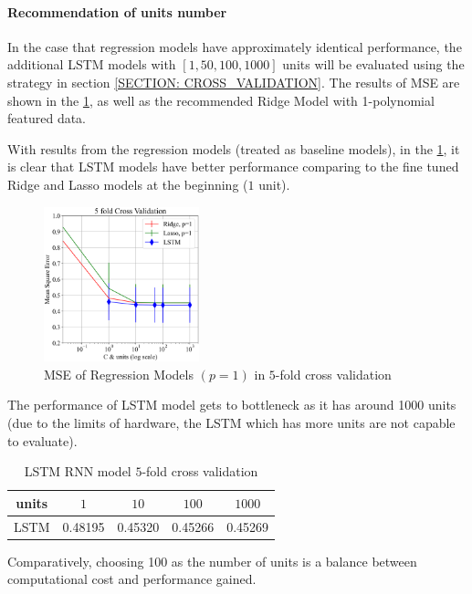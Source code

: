 \paragraph{Recommendation of units number}
In the case that regression models have approximately identical performance,
the additional LSTM models with $[1, 50, 100, 1000]$ units will be evaluated 
using the strategy in section \ref{SECTION: CROSS_VALIDATION}.
The results of MSE are shown in the \ref{FIGURES: LSTM, Ridge, Cross Validation},
as well as the recommended Ridge Model with 1-polynomial featured data.

With results from the regression models (treated as baseline models),
in the \ref{FIGURES: LSTM, Ridge, Cross Validation}, 
it is clear that LSTM models have better performance comparing 
to the fine tuned Ridge and Lasso models at the beginning ($1$ unit).
\begin{figure}[H]
    \centering
    \includegraphics[width=0.4\textwidth]{chap/fig2.png}
    \caption{
        \footnotesize 
        MSE of Regression Models $(p=1)$ in
        $5$-fold cross validation
        } %
    \label{FIGURES: LSTM, Ridge, Cross Validation}
\end{figure}
The performance of LSTM model gets to bottleneck as it has around 1000 units 
(due to the limits of hardware, the LSTM which has more units are not capable 
to evaluate). 
\begin{table}[H]
    \footnotesize
    \centering
        \caption{
            \footnotesize
            LSTM RNN model $5$-fold cross validation
        } %
    \begin{tabular}{ccccc} %
        \toprule %
        units & $1$ & $10$ & $100$ & $1000$ \\ %
        \midrule %
        LSTM & 0.48195 & 0.45320 & 0.45266 & 0.45269 \\ %
        \bottomrule %
    \end{tabular}
    \label{TABLE: LSTM CROSS VALIDATION   
    } %
\end{table}
Comparatively, choosing 100 as the number of units is a balance between 
computational cost and performance gained. 

